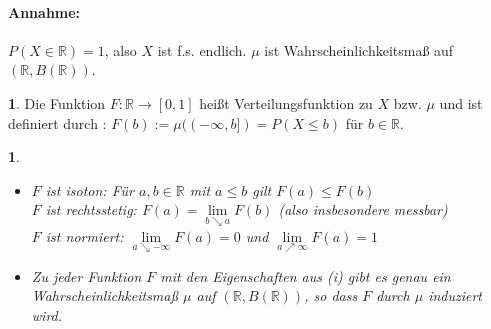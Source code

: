 \documentclass[10pt,a4paper]{report}
\newcommand{\R}{\mathbb{R}}
\numberwithin{equation}{section}
\numberwithin{figure}{section}
\theoremstyle{plain}
\theoremstyle{definition}
\newtheorem{defn}[thm]{\protect\definitionname}
\theoremstyle{remark}
\theoremstyle{plain}
\newtheorem{prop}[thm]{\protect\propositionname}
\providecommand{\definitionname}{Definition}
\providecommand{\propositionname}{Satz}
\newcommand{\1}{ \mathbb{1} } %
\begin{document}
\paragraph{Annahme:} $P(X\in \R)=1$, also $X$ ist f.s. endlich. $\mu$ ist Wahrscheinlichkeitsmaß auf $(\R,B(\R))$.
\begin{defn}  %
  Die Funktion $F:\R \to [0,1]$ heißt Verteilungsfunktion zu $X$ bzw. $\mu$ und ist definiert durch : $F(b):=\mu((-\infty,b])=P(X\leq b)$ für $b \in \R$.
\end{defn}
\begin{prop} \      %
  \begin{itemize}
  \item[(i)] $F$ ist isoton: Für $a,b \in \R$ mit $a \leq b$ gilt $F(a)\leq F(b)$\\
    $F$ ist rechtsstetig: $F(a)=\lim\limits_{b\searrow a}F(b)$ (also insbesondere messbar)\\
    $F$ ist normiert: $\lim\limits_{a\searrow -\infty}F(a)=0$ und
    $\lim\limits_{a\nearrow \infty}F(a)=1$
  \item[(ii)] Zu jeder Funktion $F$ mit den Eigenschaften aus (i) gibt
    es genau ein Wahrscheinlichkeitsmaß $\mu$ auf $(\R,B(\R))$, so dass $F$ durch $\mu$
    induziert wird.
  \end{itemize}
\end{prop}
\end{document}

